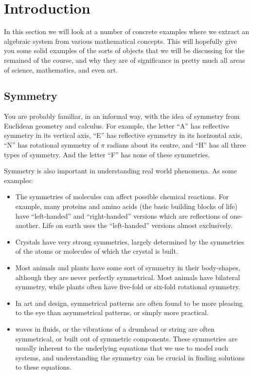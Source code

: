 \documentclass[10pt]{book}
\theoremstyle{break}
\newcounter{example}[section]
\begin{document}








\chapter{Introduction}

In this section we will look at a number of concrete examples where we
extract an algebraic system from various mathematical concepts.  This will
hopefully give you some solid examples of the sorts of objects that we will
be discussing for the remained of the course, and why they are of significance
in pretty much all areas of science, mathematics, and even art.

\section{Symmetry}

You are probably familiar, in an informal way, with the idea of symmetry from
Euclidean geometry and calculus.  For example, the letter ``\textsf{A}'' has
reflective symmetry in its vertical axis, ``\textsf{E}'' has reflective
symmetry in its horizontal axis, ``\textsf{N}'' has rotational symmetry of
$\pi$ radians about its centre, and ``\textsf{H}'' has all three types of
symmetry.  And the letter ``\textsf{F}'' has none of these symmetries.

Symmetry is also important in understanding real world phenomena.  As some
examples:
\begin{itemize}
  \item The symmetries of molecules can affect possible chemical reactions.
    For example, many proteins and amino acids (the basic building blocks of
    life) have ``left-handed'' and ``right-handed'' versions which are
    reflections of one-another.  Life on earth uses the ``left-handed''
    versions almost exclusively.
    
  \item Crystals have very strong symmetries, largely determined by the
    symmetries of the atoms or molecules of which the crystal is built.
    
  \item Most animals and plants have some sort of symmetry in their
    body-shapes, although they are never perfectly symmetrical.  Most
    animals have bilateral symmetry, while plants often have five-fold
    or six-fold rotational symmetry.
  
  \item In art and design, symmetrical patterns are often found to be more
    pleasing to the eye than asymmetrical patterns, or simply more practical.
    
  \item waves in fluids, or the vibrations of a drumhead or string are often
    symmetrical, or built out of symmetric components.  These symmetries
    are usually inherent to the underlying equations that we use to model
    such systems, and understanding the symmetry can be crucial in finding
    solutions to these equations.
\end{itemize}
\end{document}
